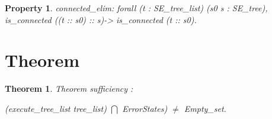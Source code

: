 \documentclass[a4paper]{article}
\newtheorem{thm}{Theorem}
\newtheorem{property}{Property}
\begin{document}
\begin{property}
connected\_elim: 
forall (t : SE\_tree\_list) (s0 s : SE\_tree),
is\_connected ((t :: s0) :: s)->
is\_connected (t :: s0).
\end{property}


\section{Theorem}
\begin{thm}
Theorem sufficiency : 

(execute\_tree\_list tree\_list) $\bigcap$ ErrorStates)
$\neq$ Empty\_set.
\end{thm}
%
%
%
%
%
%
%
%
%
\end{document}

